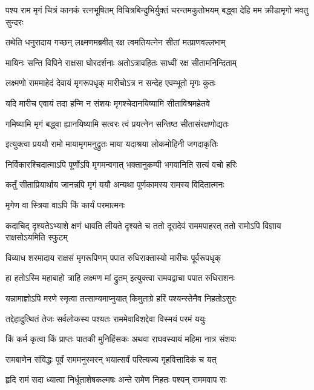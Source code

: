 \threelineshloka
{पश्य राम मृगं चित्रं कानकं रत्नभूषितम्}
{विचित्रबिन्दुभिर्युक्तं चरन्तमकुतोभयम्}
{बद्ध्वा देहि मम क्रीडामृगो भवतु सुन्दरः} %

\twolineshloka
{तथेति धनुरादाय गच्छन् लक्ष्मणमब्रवीत्}
{रक्ष त्वमतियत्नेन सीतां मत्प्राणवल्लभाम्} %

\twolineshloka
{मायिनः सन्ति विपिने राक्षसा घोरदर्शनाः}
{अतोऽत्रावहितः साध्वीं रक्ष सीतामनिन्दिताम्} %

\twolineshloka
{लक्ष्मणो राममाहेदं देवायं मृगरूपधृक्}
{मारीचोऽत्र न सन्देह एवम्भूतो मृगः कुतः} %


\twolineshloka
{यदि मारीच एवायं तदा हन्मि न संशयः}
{मृगश्चेदानयिष्यामि सीताविश्रमहेतवे} %

\twolineshloka
{गमिष्यामि मृगं बद्ध्वा ह्यानयिष्यामि सत्वरः}
{त्वं प्रयत्नेन सन्तिष्ठ सीतासंरक्षणोद्यतः} %

\twolineshloka
{इत्युक्त्वा प्रययौ रामो मायामृगमनुद्रुतः}
{माया यदाश्रया लोकमोहिनी जगदाकृतिः} %

\twolineshloka
{निर्विकारश्चिदात्माऽपि पूर्णोऽपि मृगमन्वगात्}
{भक्तानुकम्पी भगवानिति सत्यं वचो हरिः} %

\twolineshloka
{कर्तुं सीताप्रियार्थाय जानन्नपि मृगं ययौ}
{अन्यथा पूर्णकामस्य रामस्य विदितात्मनः} %

\onelineshloka
{मृगेण वा स्त्रिया वाऽपि किं कार्यं परमात्मनः} %


\threelineshloka
{कदाचिद् दृश्यतेऽभ्याशे क्षणं धावति लीयते}
{दृश्यते च ततो दूरादेवं राममपाहरत्}
{ततो रामोऽपि विज्ञाय राक्षसोऽयमिति स्फुटम्} %

\twolineshloka
{विव्याध शरमादाय राक्षसं मृगरूपिणम्}
{पपात रुधिराक्तास्यो मारीचः पूर्वरूपधृक्} %

\twolineshloka
{हा हतोऽस्मि महाबाहो त्राहि लक्ष्मण मां द्रुतम्}
{इत्युक्त्वा रामवद्वाचा पपात रुधिराशनः} %

\twolineshloka
{यन्नामाज्ञोऽपि मरणे स्मृत्वा तत्साम्यमाप्नुयात्}
{किमुताग्रे हरिं पश्यन्स्तेनैव निहतोऽसुरः} %

\twolineshloka
{तद्देहादुत्थितं तेजः सर्वलोकस्य पश्यतः}
{राममेवाविशद्देवा विस्मयं परमं ययुः} %

\twolineshloka
{किं कर्म कृत्वा किं प्राप्तः पातकी मुनिहिंसकः}
{अथवा राघवस्यायं महिमा नात्र संशयः} %

\twolineshloka
{रामबाणेन संविद्धः पूर्वं राममनुस्मरन्}
{भयात्सर्वं परित्यज्य गृहवित्तादिकं च यत्} %

\twolineshloka
{हृदि रामं सदा ध्यात्वा निर्धूताशेषकल्मषः}
{अन्ते रामेण निहतः पश्यन् राममवाप सः} %

